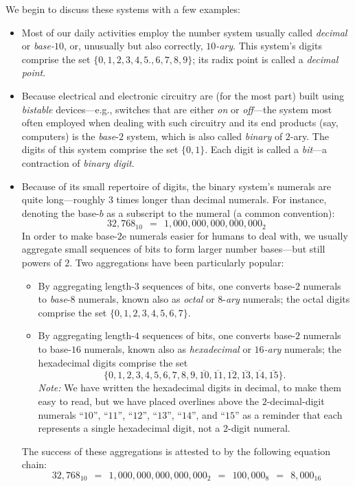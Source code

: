 \noindent
We begin to discuss these systems with a few examples:
\begin{itemize}
\item
Most of our daily activities employ the number system usually called
{\it decimal} or {\it base-$10$}, or, unusually but also correctly,
{\it $10$-ary}.   
 
This system's digits comprise the set $\{0, 1, 2, 3, 4, 5., 6, 7, 8,
9\}$; its radix point is called a {\em decimal point}.

\item
Because electrical and electronic circuitry are (for the most part)
built using {\it bistable} devices---e.g., switches that are either
{\em on} or {\em off}---the system most often employed when dealing
with such circuitry and its end products (say, computers) is the
{\it base}-$2$ system, which is also called {\it binary} of $2$-ary.
The digits of this system comprise the set $\{0, 1\}$.  Each digit is
called a {\it bit}---a contraction of {\it binary digit}.

\item
Because of its small repertoire of digits, the binary system's
numerals are quite long---roughly $3$ times longer than decimal
numerals.  For instance, denoting the base-$b$ as a subscript to the
numeral (a common convention):
\[ 32,768_{10} \ \ = \ \ 1,000,000,000,000,000_2 \]
In order to make base-$2$e numerals easier for humans to deal with, we
usually aggregate small sequences of bits to form larger number
bases---but still powers of $2$.  Two aggregations have been
particularly popular:
  \begin{itemize}
  \item
By aggregating length-$3$ sequences of bits, one converts base-$2$
numerals to {\it base}-$8$ numerals, known also as {\it octal} or
$8$-{\it ary} numerals;
 the octal digits comprise
the set $\{0, 1, 2, 3, 4, 5, 6, 7\}$.
  \item
By aggregating length-$4$ sequences of bits, one converts base-$2$
numerals to base-$16$ numerals, known also as {\it hexadecimal} or
{\it $16$-ary} numerals;  
the hexadecimal digits comprise the set 
\[ \{0, 1, 2, 3, 4, 5, 6, 7, 8, 9, \overline{10}, \overline{11},
\overline{12}, \overline{13}, \overline{14}, \overline{15}\}.
\]
{\it Note:} We have written the hexadecimal digits in decimal, to make
them easy to read, but we have placed overlines above the
$2$-decimal-digit numerals ``$10$'', ``$11$'', ``$12$'', ``$13$'',
``$14$'', and ``$15$'' as a reminder that each represents a single
hexadecimal digit, not a $2$-digit numeral.
  \end{itemize}
The success of these aggregations is attested to by the following
equation chain:
\[ 32,768_{10} \ \ = \ \ 1,000,000,000,000,000_2 \ \ = \ \
100,000_8 \ \ = \ \ 8,000_{16}
\]
\end{itemize}

